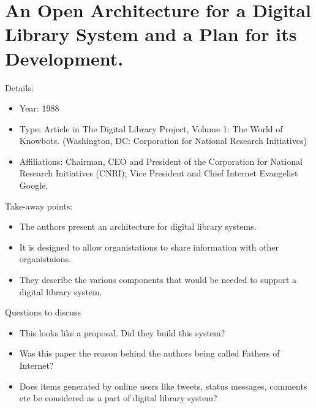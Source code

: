 \documentclass[12pt, onecolumn]{IEEEtran}
\begin{document}
\section{An Open Architecture for a Digital Library System and a Plan for its
Development. \cite{openframework}}
\noindent Details:
\begin{itemize}
  \item Year: 1988
  \item Type: Article in The Digital Library Project, Volume 1: The World of
  Knowbots. (Washington, DC: Corporation for National Research Initiatives)
  \item Affiliations: Chairman, CEO and President of the Corporation for
  National Research Initiatives (CNRI); Vice President and Chief Internet
  Evangelist Google.
\end{itemize}
\medskip
Take-away points:
\begin{itemize}
  \item The authors present an architecture for digital library systems.
  \item It is designed to allow organistations to share information with other
  organistaions.
  \item They describe the various components that would be needed to support a
  digital library system.
\end{itemize}
	
\noindent Questions to discuss
\begin{itemize}
  \item This looks like a proposal. Did they build this system? 
  \item Was this paper the reason behind the authors being called Fathers of
  Internet?
  \item Does items generated by online users like tweets, status messages,
  comments etc be considered as a part of digital library system?
\end{itemize}
\bigskip\bigskip
\end{document}
